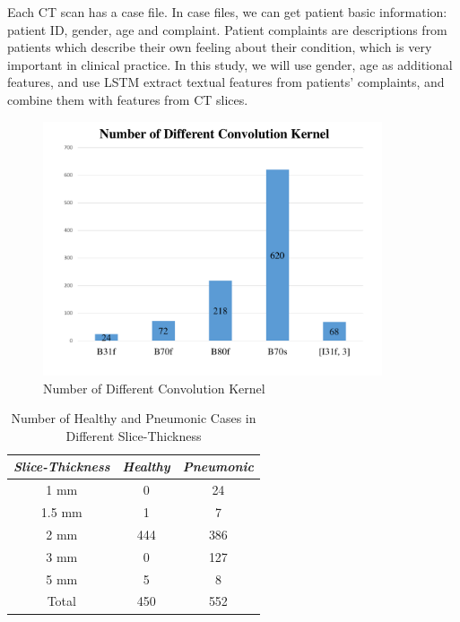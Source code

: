 \documentclass[runningheads]{llncs}
\begin{document}
Each CT scan has a case file. In case files, we can get patient basic information: patient ID, gender, age and complaint. Patient complaints are descriptions from patients which describe their own feeling about their condition, which is very important in clinical practice. In this study, we will use gender, age as additional features, and use LSTM extract textual features from patients' complaints, and combine them with features from CT slices.

\begin{figure}[t]
\centerline{\includegraphics[width=100mm]{NumberofDifferentConvolutionKernel.pdf}}
\vspace{-0cm}
\caption{Number of Different Convolution Kernel}
\vspace{-0cm}
\label{NumberofDifferentConvolutionKernel}
\end{figure}


\begin{table}[htb]
\vspace{-0cm}
\caption{Number of Healthy and Pneumonic Cases in Different Slice-Thickness}
\vspace{-0cm}
\begin{center}
\begin{tabular}{|c|c|c|}
\hline
\textbf{\textit{Slice-Thickness}}& \textbf{\textit{Healthy}}& \textbf{\textit{Pneumonic}}  \\
\hline
1 mm & 0 & 24 \\
1.5 mm  & 1 & 7\\
2 mm & 444 & 386  \\
3 mm & 0 & 127  \\
5 mm & 5 & 8  \\
\hline
Total & 450 & 552 \\
\hline
\end{tabular}
\vspace{-0cm}
\label{distributionofhealthyandpneumonic}
\end{center}
\vspace{-0cm}
\end{table}
\end{document}
